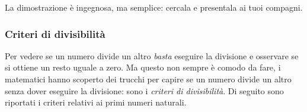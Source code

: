 La dimostrazione è ingegnosa, ma semplice: cercala e presentala ai tuoi 
compagni.


\subsubsection{Criteri di divisibilità}
\label{subsec:nat_criteridivisibilita}

Per vedere se un numero divide un altro \emph{basta} eseguire la 
divisione e osservare se si ottiene un resto uguale a zero. 
Ma questo non sempre è comodo da fare, i matematici hanno scoperto dei
trucchi per capire se un numero divide un altro senza dover eseguire 
la divisione: sono i \emph{criteri di divisibilità}. 
Di seguito sono riportati i criteri relativi ai primi numeri naturali.

